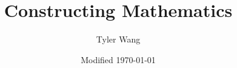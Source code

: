\documentclass[10pt, openany, english]{extbook}
\title{Constructing Mathematics}
\date{\small Modified \today}
\author{Tyler Wang}
\begin{document}
\maketitle


\edef\mychapter{Contents}
\tableofcontents










\end{document}
